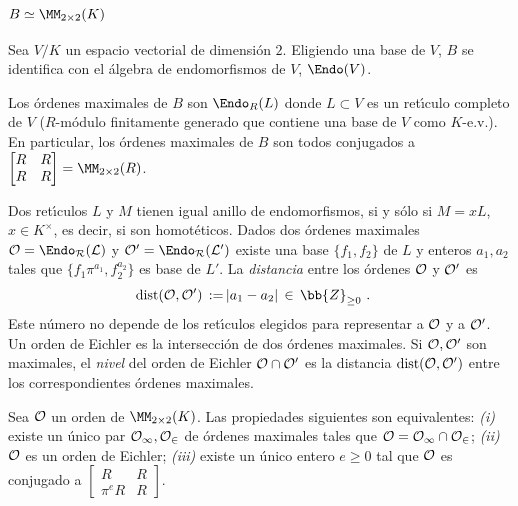 \subsubsection{$B\simeq\MM_{2\times 2}(K)$}
Sea $V/K$ un espacio vectorial de dimensi\'{o}n $2$. Eligiendo una base
de $V$, $B$ se identifica con el \'{a}lgebra de endomorfismos de $V$,
$\Endo(V)$.

Los \'{o}rdenes maximales de $B$ son $\Endo_{R}(L)$ donde $L\subset V$ es
un ret\'{\i}culo completo de $V$ ($R$-m\'{o}dulo finitamente generado que
contiene una base de $V$ como $K$-e.v.). En particular, los \'{o}rdenes
maximales de $B$ son todos conjugados %
a $\begin{bmatrix} R & R \\ R & R \end{bmatrix}=\MM_{2\times 2}(R)$.

\begin{obsNivelDeUnEichler}
Dos ret\'{\i}culos $L$ y $M$ tienen igual anillo de endomorfismos, si
y s\'{o}lo si $M=xL$, $x\in K^{\times}$, es decir, si son homot\'{e}ticos.
Dados dos \'{o}rdenes maximales $\cal{O}=\Endo_{R}(L)$ y
$\cal{O}'=\Endo_{R}(L')$ existe una base $\{f_{1},f_{2}\}$ de $L$ y 
enteros $a_{1},a_{2}$ tales que $\{f_{1}\pi^{a_{1}},f_{2}^{a_{2}}\}$
es base de $L'$. La \emph{distancia} entre los \'{o}rdenes $\cal{O}$ y
$\cal{O}'$ es
\begin{align*}
 \mathrm{dist}(\cal{O},\cal{O}')\,:=\, & |a_{1}-a_{2}|
	\,\in\,\bb{Z}_{\geq 0}
	\text{ .}
\end{align*}
%
Este n\'{u}mero no depende de los ret\'{\i}culos elegidos para representar
a $\cal{O}$ y a $\cal{O}'$. Un orden de Eichler es la intersecci\'{o}n
de dos \'{o}rdenes maximales. Si $\cal{O},\cal{O}'$ son maximales,
el \emph{nivel} del orden de Eichler $\cal{O}\cap\cal{O}'$ es la
distancia $\mathrm{dist}(\cal{O},\cal{O}')$ entre los correspondientes
\'{o}rdenes maximales.
\end{obsNivelDeUnEichler}

\begin{propoOrdEichlerSplitAlg}
 Sea $\cal{O}$ un orden de $\MM_{2\times 2}(K)$. Las propiedades
 siguientes son equivalentes:
 \textit{(i)} existe un \'{u}nico par $\cal{O}_{1},\cal{O}_{2}$ de
 \'{o}rdenes maximales tales que $\cal{O}=\cal{O}_{1}\cap\cal{O}_{2}$;
 \textit{(ii)} $\cal{O}$ es un orden de Eichler;
 \textit{(iii)} existe un \'{u}nico entero $e\geq 0$ tal que $\cal{O}$
	es conjugado a $\begin{bmatrix} R & R \\ \pi^{e}R & R \end{bmatrix}$.
\end{propoOrdEichlerSplitAlg}


